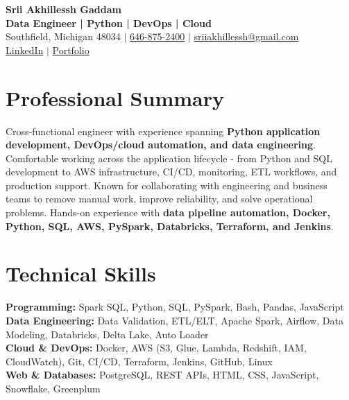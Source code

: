 \documentclass[letterpaper,10pt]{article}
\begin{document}
\fontsize{9.35pt}{10.45pt}\selectfont

\begin{center}
    {\LARGE \textbf{Srii Akhillessh Gaddam}} \\[-1pt]
    \textbf{Data Engineer | Python | DevOps | Cloud} \\[2pt]
    Southfield, Michigan 48034 $|$
    \href{tel:6468752400}{646-875-2400} $|$
    \href{mailto:sriiakhillessh@gmail.com}{sriiakhillessh@gmail.com} \\[1pt]
    \href{https://www.linkedin.com/in/srii-akhiilessh-gaddam-b48668191/}{LinkedIn} $|$
    \href{https://sriiakhillesshg.github.io/portfolio/}{Portfolio}
\end{center}
\vspace{-8pt}

\section{Professional Summary}
\small{Cross-functional engineer with experience spanning \textbf{Python application development, DevOps/cloud automation, and data engineering}. Comfortable working across the application lifecycle - from Python and SQL development to AWS infrastructure, CI/CD, monitoring, ETL workflows, and production support. Known for collaborating with engineering and business teams to remove manual work, improve reliability, and solve operational problems. Hands-on experience with \textbf{data pipeline automation, Docker, Python, SQL, AWS, PySpark, Databricks, Terraform, and Jenkins}.}

\section{Technical Skills}
\small{
\textbf{Programming:} Spark SQL, Python, SQL, PySpark, Bash, Pandas, JavaScript \\
\textbf{Data Engineering:} Data Validation, ETL/ELT, Apache Spark, Airflow, Data Modeling, Databricks, Delta Lake, Auto Loader \\
\textbf{Cloud \& DevOps:} Docker, AWS (S3, Glue, Lambda, Redshift, IAM, CloudWatch), Git, CI/CD, Terraform, Jenkins, GitHub, Linux \\
\textbf{Web \& Databases:} PostgreSQL, REST APIs, HTML, CSS, JavaScript, Snowflake, Greenplum
}

\end{document}
